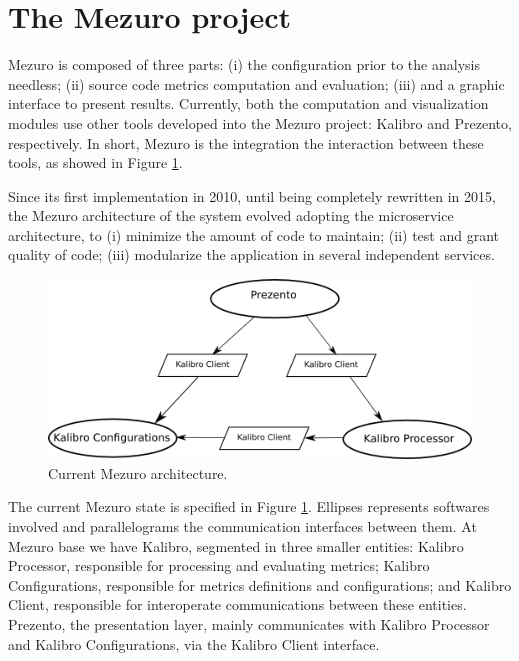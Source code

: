 \section{The Mezuro project}
\label{sec:mezuro}

Mezuro is composed of three parts:
(i) the configuration prior to the analysis needless;
(ii) source code metrics computation and evaluation;
(iii) and a graphic interface to present results.
%
Currently, both the computation and visualization modules use other tools
developed into the Mezuro project: Kalibro and Prezento, respectively. In
short, Mezuro is the integration the interaction between these tools, as showed
in Figure \ref{fig:architecture-2}.

Since its first implementation in 2010\cite{mezuro2012}, until being completely
rewritten in 2015, the Mezuro architecture of the system evolved adopting the
microservice architecture\cite{namiot2014micro}, to (i) minimize the amount of
code to maintain; (ii) test and grant quality of code; (iii) modularize the
application in several independent services.

\begin{figure}[hbt]
  \centering
    \includegraphics[width=.8\linewidth]{images/mezuro-architecturev3.png}
  \caption{Current Mezuro architecture.}
  \label{fig:architecture-2}
\end{figure}

The current Mezuro state is specified in Figure \ref{fig:architecture-2}.
Ellipses represents softwares involved and parallelograms the communication
interfaces between them. At Mezuro base we have Kalibro, segmented in three
smaller entities: Kalibro Processor, responsible for processing and evaluating
metrics; Kalibro Configurations, responsible for metrics definitions and
configurations; and Kalibro Client, responsible for interoperate communications
between these entities.  Prezento, the presentation layer, mainly communicates
with Kalibro Processor and Kalibro Configurations, via the Kalibro Client
interface.

